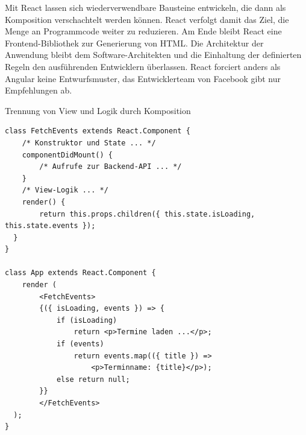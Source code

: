 Mit React lassen sich wiederverwendbare Bausteine entwickeln, die dann als Komposition verschachtelt werden können. React verfolgt damit das Ziel, die Menge an Programmcode weiter zu reduzieren\cite{ReactSoC}. Am Ende bleibt React eine Frontend-Bibliothek zur Generierung von HTML. Die Architektur der Anwendung bleibt dem Software-Architekten und die Einhaltung der definierten Regeln den ausführenden Entwicklern überlassen. React forciert anders als Angular keine Entwurfsmuster, das Entwicklerteam von Facebook gibt nur Empfehlungen ab.

\begin{listing}
\caption{Trennung von View und Logik durch Komposition}
\label{lst:listing16}
\begin{verbatim}
class FetchEvents extends React.Component {
    /* Konstruktor und State ... */
    componentDidMount() {
        /* Aufrufe zur Backend-API ... */
    }
    /* View-Logik ... */
    render() {
        return this.props.children({ this.state.isLoading, this.state.events });
  }
}

class App extends React.Component {
    render (
        <FetchEvents>
        {({ isLoading, events }) => {
            if (isLoading) 
                return <p>Termine laden ...</p>;
            if (events) 
                return events.map(({ title }) => 
                    <p>Terminname: {title}</p>);
            else return null;
        }}
        </FetchEvents>
  );
}
\end{verbatim}
\end{listing}